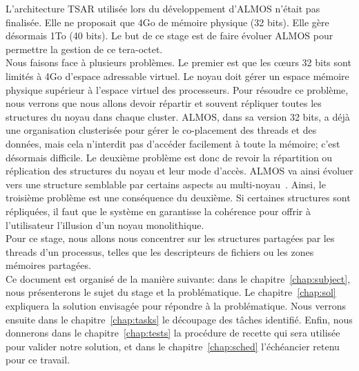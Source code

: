   \hspace{1cm}L'architecture TSAR utilisée lors du développement d'ALMOS n'était
  pas finalisée. Elle ne proposait que 4Go de mémoire physique (32 bits). Elle
  gère désormais 1To (40 bits). Le but de ce stage est de faire évoluer ALMOS
  pour permettre la gestion de ce tera-octet.\\

  \hspace{1cm}Nous faisons face à plusieurs problèmes. Le premier est que les
  c\oe urs 32 bits sont limités à 4Go d'espace adressable virtuel. Le noyau doit
  gérer un espace mémoire physique supérieur à l'espace virtuel des
  processeurs. Pour résoudre ce problème, nous verrons que nous allons devoir
  répartir et souvent répliquer toutes les structures du noyau dans chaque
  cluster. ALMOS, dans sa version 32 bits, a déjà une organisation clusterisée
  pour gérer le co-placement des threads et des données, mais cela n'interdit
  pas d'accéder facilement à toute la mémoire; c'est désormais difficile. Le
  deuxième problème est donc de revoir la répartition ou réplication des
  structures du noyau et leur mode d'accès. ALMOS va ainsi évoluer vers une
  structure semblable par certains aspects au
  multi-noyau~\citep{baumann2009multikernel}. Ainsi, le troisième problème est
  une conséquence du deuxième. Si certaines structures sont répliquées, il faut
  que le système en garantisse la cohérence pour offrir à l'utilisateur
  l'illusion d'un noyau monolithique. \\

  \hspace{1cm}Pour ce stage, nous allons nous concentrer sur les structures
  partagées par les threads d'un processus, telles que les descripteurs de
  fichiers ou les zones mémoires partagées. \\


  \hspace{1cm}Ce document est organisé de la manière suivante: dans le
  chapitre~\ref{chap:subject}, nous présenterons le sujet du stage et la
  problématique. Le chapitre~\ref{chap:sol} expliquera la solution envisagée
  pour répondre à la problématique. Nous verrons ensuite dans le
  chapitre~\ref{chap:tasks} le découpage des tâches identifié. Enfin, nous
  donnerons dans le chapitre~\ref{chap:tests} la procédure de recette qui sera
  utilisée pour valider notre solution, et dans le chapitre~\ref{chap:sched}
  l'échéancier retenu pour ce travail.

